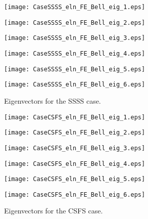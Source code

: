 \documentclass[11pt]{article}
\begin{document}
	\begin{figure}[p]%
		\texttt{[image: CaseSSSS\_eln\_FE\_Bell\_eig\_1.eps]}
		\caption*{$\widehat{\omega}_{1}$}\label{fig:SSSS1}%
		\endminipage
		\texttt{[image: CaseSSSS\_eln\_FE\_Bell\_eig\_2.eps]}
		\caption*{$\widehat{\omega}_{2}$}\label{fig:SSSS2}%
		\endminipage
		\texttt{[image: CaseSSSS\_eln\_FE\_Bell\_eig\_3.eps]}
		\caption*{$\widehat{\omega}_{3}$}\label{fig:SSSS3}%
		\endminipage
		\texttt{[image: CaseSSSS\_eln\_FE\_Bell\_eig\_4.eps]}
		\caption*{$\widehat{\omega}_{4}$}\label{fig:SSSS4}%
		\endminipage
		\texttt{[image: CaseSSSS\_eln\_FE\_Bell\_eig\_5.eps]}
		\caption*{$\widehat{\omega}_{5}$}\label{fig:SSSS5}%
		\endminipage
		\texttt{[image: CaseSSSS\_eln\_FE\_Bell\_eig\_6.eps]}
		\caption*{$\widehat{\omega}_{6}$}\label{fig:SSSS6}%
		\endminipage
		\caption[Eigenvectors for SSSS]{Eigenvectors for the SSSS case.}%
		\label{fig:SSSS}%
	\end{figure}
	\begin{figure}[p]%
		\texttt{[image: CaseCSFS\_eln\_FE\_Bell\_eig\_1.eps]}
		\caption*{$\widehat{\omega}_{1}$}\label{fig:CSFS1}%
		\endminipage
		\texttt{[image: CaseCSFS\_eln\_FE\_Bell\_eig\_2.eps]}
		\caption*{$\widehat{\omega}_{2}$}\label{fig:CSFS2}%
		\endminipage
		\texttt{[image: CaseCSFS\_eln\_FE\_Bell\_eig\_3.eps]}
		\caption*{$\widehat{\omega}_{3}$}\label{fig:CSFS3}%
		\endminipage
		\texttt{[image: CaseCSFS\_eln\_FE\_Bell\_eig\_4.eps]}
		\caption*{$\widehat{\omega}_{4}$}\label{fig:CSFS4}%
		\endminipage
		\texttt{[image: CaseCSFS\_eln\_FE\_Bell\_eig\_5.eps]}
		\caption*{$\widehat{\omega}_{5}$}\label{fig:CSFS5}%
		\endminipage
		\texttt{[image: CaseCSFS\_eln\_FE\_Bell\_eig\_6.eps]}
		\caption*{$\widehat{\omega}_{6}$}\label{fig:CSFS6}%
		\endminipage
		\caption[Eigenvectors for CSFS]{Eigenvectors for the CSFS case.}%
		\label{fig:CSFS}%
	\end{figure}
\end{document}
